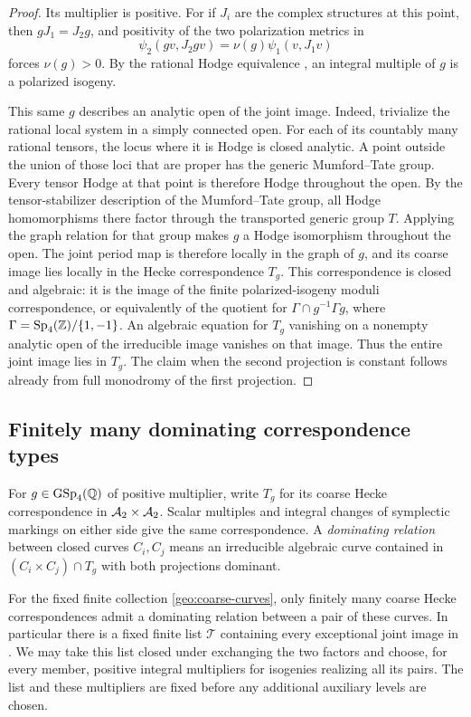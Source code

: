\begin{proof}
Its multiplier is positive.  For if $J_i$ are the complex
structures at this point, then $gJ_1=J_2g$, and positivity of
the two polarization metrics in
\[
 \psi_2(gv,J_2gv)=\nu(g)\psi_1(v,J_1v)
\]
forces $\nu(g)>0$.  By the rational Hodge equivalence
\cite[Theorem~4.1]{MilneShimura1995}, an integral multiple of
$g$ is a polarized isogeny.

This same $g$ describes an analytic open of the joint image.
Indeed, trivialize the rational local system in a simply
connected open.  For each of its countably many rational tensors,
the locus where it is Hodge is closed analytic.  A point outside
the union of those loci that are proper has the generic
Mumford--Tate group.  Every tensor Hodge at that point is
therefore Hodge throughout the open.  By the tensor-stabilizer
description of the Mumford--Tate group, all Hodge homomorphisms
there factor through the transported generic group $T$.
Applying the graph relation
for that group makes $g$ a Hodge isomorphism throughout the
open.  The joint period map is therefore locally in the graph
of $g$, and its coarse image lies locally in the Hecke
correspondence $T_g$.  This correspondence is closed and
algebraic: it is the image of the finite polarized-isogeny
moduli correspondence, or equivalently of the quotient for
$\Gamma\cap g^{-1}\Gamma g$, where
$\Gamma=\operatorname{Sp}_4(\mathbb Z)/\{1,-1\}$.  An algebraic equation for $T_g$
vanishing on a nonempty analytic open of the irreducible image
vanishes on that image.  Thus the entire joint image lies in
$T_g$.  The claim when the second projection is constant follows
already from full monodromy of the first projection.
\end{proof}

\subsection{Finitely many dominating correspondence types}

For $g\in\operatorname{GSp}_4(\mathbb Q)$ of positive multiplier, write $T_g$ for its
coarse Hecke correspondence in $\mathcal A_2\times\mathcal A_2$.  Scalar multiples
and integral changes of symplectic markings on either side give
the same correspondence.  A \emph{dominating relation} between
closed curves $C_i,C_j$ means an irreducible algebraic curve
contained in $(C_i\times C_j)\cap T_g$ with both projections
dominant.

\begin{proposition}\label{geo:hecke-list}
For the fixed finite collection \eqref{geo:coarse-curves}, only
finitely many coarse Hecke correspondences admit a dominating
relation between a pair of these curves.  In particular there is
a fixed finite list $\mathcal T$ containing every exceptional
joint image in .  We may take this list closed
under exchanging the two factors and choose, for every member,
positive integral multipliers for isogenies realizing all its
pairs.  The list and these multipliers are fixed before any
additional auxiliary levels are chosen.
\end{proposition}

